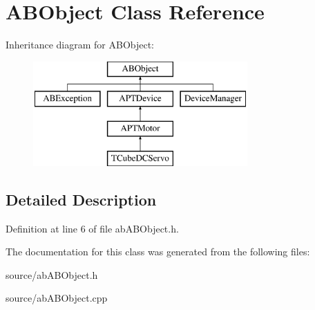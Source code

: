 \hypertarget{class_a_b_object}{}\section{A\+B\+Object Class Reference}
\label{class_a_b_object}
Inheritance diagram for A\+B\+Object\+:\begin{figure}[H]
\begin{center}
\leavevmode
\includegraphics[height=4.000000cm]{class_a_b_object}
\end{center}
\end{figure}


\subsection{Detailed Description}


Definition at line 6 of file ab\+A\+B\+Object.\+h.



The documentation for this class was generated from the following files\+:\begin{DoxyCompactItemize}
\item 
source/ab\+A\+B\+Object.\+h\item 
source/ab\+A\+B\+Object.\+cpp\end{DoxyCompactItemize}
